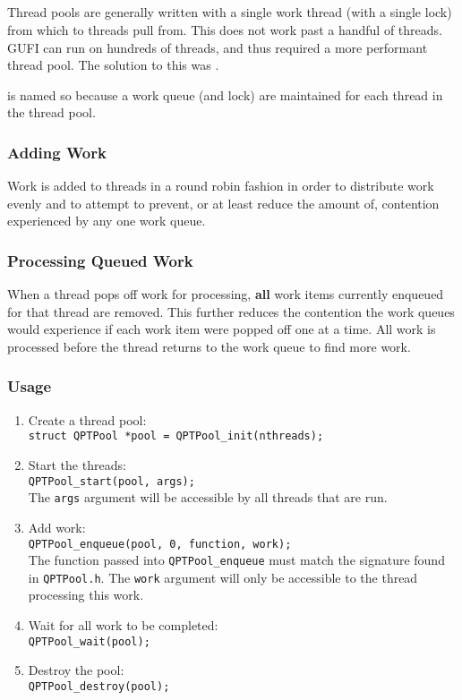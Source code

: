 \subsection{\qptp}
Thread pools are generally written with a single work thread (with a
single lock) from which to threads pull from. This does not work past
a handful of threads. GUFI can run on hundreds of threads, and thus
required a more performant thread pool. The solution to this was
\qptp.

\qptp is named so because a work queue (and lock) are
maintained for each thread in the thread pool.

\subsubsection{Adding Work}
Work is added to threads in a round robin fashion in order to
distribute work evenly and to attempt to prevent, or at least reduce
the amount of, contention experienced by any one work queue.

\subsubsection{Processing Queued Work}
When a thread pops off work for processing, {\bf all} work items
currently enqueued for that thread are removed. This further reduces
the contention the work queues would experience if each work item were
popped off one at a time. All work is processed before the thread
returns to the work queue to find more work.

\subsubsection{Usage}
\begin{enumerate}
\item Create a thread pool: \\ \texttt{struct QPTPool *pool =
  QPTPool\_init(nthreads);}
\item Start the threads: \\ \texttt{QPTPool\_start(pool, args);}
  \\ The \texttt{args} argument will be accessible by all threads that
  are run.
\item Add work: \\ \texttt{QPTPool\_enqueue(pool, 0, function,
  work);} \\ The function passed into \texttt{QPTPool\_enqueue} must
  match the signature found in \texttt{QPTPool.h}. The \texttt{work}
  argument will only be accessible to the thread processing this work.
\item Wait for all work to be completed:
  \\ \texttt{QPTPool\_wait(pool);}
\item Destroy the pool: \\ \texttt{QPTPool\_destroy(pool);}
\end{enumerate}

